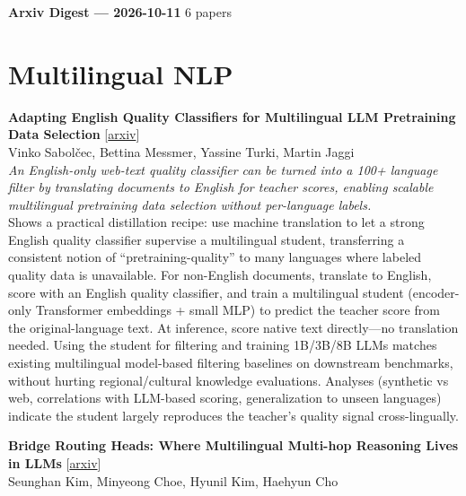 \documentclass[12pt,letterpaper]{article}
\begin{document}
{\footnotesize\textbf{Arxiv Digest --- 2026-10-11} \hfill 6 papers}

\smallskip

\section*{Multilingual NLP}

{\small\textbf{Adapting English Quality Classifiers for Multilingual LLM Pretraining Data Selection}} {\scriptsize[\href{https://arxiv.org/abs/2610.11585}{arxiv}]}\\
{\scriptsize Vinko Sabolčec, Bettina Messmer, Yassine Turki, Martin Jaggi}\\

{\small\textit{An English-only web-text quality classifier can be turned into a 100+ language filter by translating documents to English for teacher scores, enabling scalable multilingual pretraining data selection without per-language labels.}}\\[1pt]
{\footnotesize Shows a practical distillation recipe: use machine translation to let a strong English quality classifier supervise a multilingual student, transferring a consistent notion of ``pretraining-quality'' to many languages where labeled quality data is unavailable. For non-English documents, translate to English, score with an English quality classifier, and train a multilingual student (encoder-only Transformer embeddings + small MLP) to predict the teacher score from the original-language text. At inference, score native text directly---no translation needed. Using the student for filtering and training 1B/3B/8B LLMs matches existing multilingual model-based filtering baselines on downstream benchmarks, without hurting regional/cultural knowledge evaluations. Analyses (synthetic vs web, correlations with LLM-based scoring, generalization to unseen languages) indicate the student largely reproduces the teacher's quality signal cross-lingually.}

\medskip

{\small\textbf{Bridge Routing Heads: Where Multilingual Multi-hop Reasoning Lives in LLMs}} {\scriptsize[\href{https://arxiv.org/abs/2610.09733}{arxiv}]}\\
{\scriptsize Seunghan Kim, Minyeong Choe, Hyunil Kim, Haehyun Cho}\\
\end{document}
